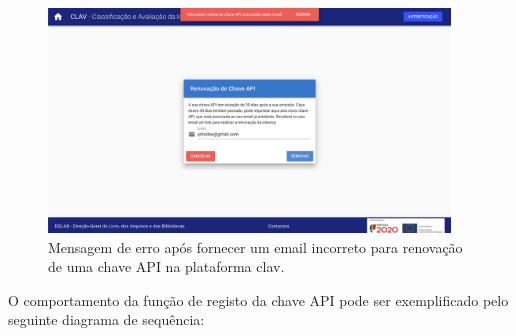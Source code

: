 \begin{itemize}
    \begin{figure}[H]
        \centering
        \includegraphics[width=0.95\textwidth]{img/clav/authAPI/erroRenovacao.png}
        \caption{Mensagem de erro após fornecer um email incorreto para renovação de uma chave API na plataforma \gls{clav}.}
        \label{fig:renovarChaveApiSucesso}
    \end{figure}
\end{itemize}

\cleardoublepage
\vspace{-2mm}
O comportamento da função de registo da chave API pode ser exemplificado pelo seguinte diagrama de sequência:

